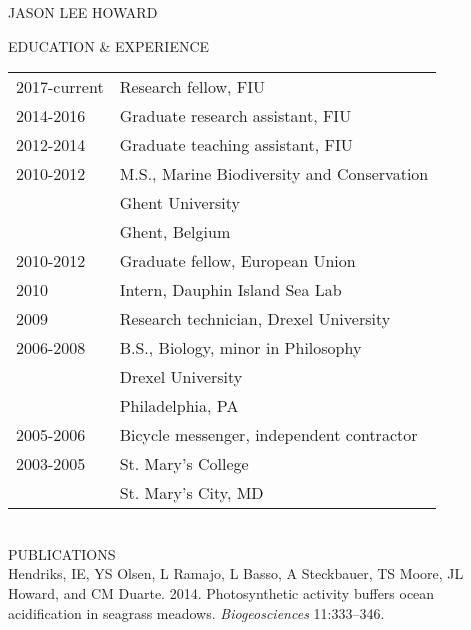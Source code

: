 \begin{center}
JASON LEE HOWARD \\[4ex]
\end{center}

\noindent EDUCATION \& EXPERIENCE\\[1ex]

\begin{tabular}{ll}

2017-current 	\hspace{1in} & Research fellow, FIU \\[2ex]

2014-2016  & Graduate research assistant, FIU \\[2ex]

2012-2014 	& Graduate teaching assistant, FIU \\[2ex]

2010-2012         & M.S., Marine Biodiversity and Conservation \\
                & Ghent University \\
		& Ghent, Belgium \\[2ex]

2010-2012 & Graduate fellow, European Union \\[2ex]

2010 & Intern, Dauphin Island Sea Lab \\[2ex]

2009 & Research technician, Drexel University \\[2ex]

2006-2008 		& B.S., Biology, minor in Philosophy \\
	        & Drexel University \\
		& Philadelphia, PA \\[2ex]

2005-2006 & Bicycle messenger, independent contractor \\[2ex]

2003-2005            & St. Mary's College \\
                & St. Mary's City, MD  \\[2ex]

\end{tabular}
\\[3.6ex]

\noindent
PUBLICATIONS\\[1ex]

\noindent
Hendriks, IE, YS Olsen, L Ramajo, L Basso, A Steckbauer, TS Moore, JL Howard, and CM Duarte. 2014. Photosynthetic activity buffers ocean acidification in seagrass meadows. {\em Biogeosciences} 11:333–346.\\[1ex]

